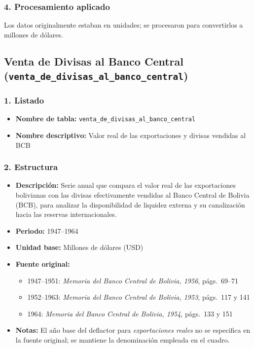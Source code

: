 \documentclass[12pt,a4paper]{article}
\begin{document}
\subsubsection*{4. Procesamiento aplicado}
Los datos originalmente estaban en unidades; se procesaron para convertirlos a millones de dólares.

\subsection{Venta de Divisas al Banco Central\\
\small(\texttt{venta\_de\_divisas\_al\_banco\_central})}

\subsubsection*{1. Listado}
\begin{itemize}
  \item \textbf{Nombre de tabla:} \texttt{venta\_de\_divisas\_al\_banco\_central}
  \item \textbf{Nombre descriptivo:} Valor real de las exportaciones y divisas vendidas al BCB
\end{itemize}

\subsubsection*{2. Estructura}
\begin{itemize}
  \item \textbf{Descripción:} Serie anual que compara el valor real de las exportaciones bolivianas con las divisas efectivamente vendidas al Banco Central de Bolivia (BCB), para analizar la disponibilidad de liquidez externa y su canalización hacia las reservas internacionales.
  \item \textbf{Periodo:} 1947--1964
  \item \textbf{Unidad base:} Millones de dólares (USD)
  \item \textbf{Fuente original:}
    \begin{itemize}
      \item 1947--1951: \emph{Memoria del Banco Central de Bolivia, 1956}, págs.\ 69--71
      \item 1952--1963: \emph{Memoria del Banco Central de Bolivia, 1953}, págs.\ 117 y 141
      \item 1964: \emph{Memoria del Banco Central de Bolivia, 1954}, págs.\ 133 y 151
    \end{itemize}
  \item \textbf{Notas:} El año base del deflactor para \emph{exportaciones reales} no se especifica en la fuente original; se mantiene la denominación empleada en el cuadro.
\end{itemize}
\end{document}
